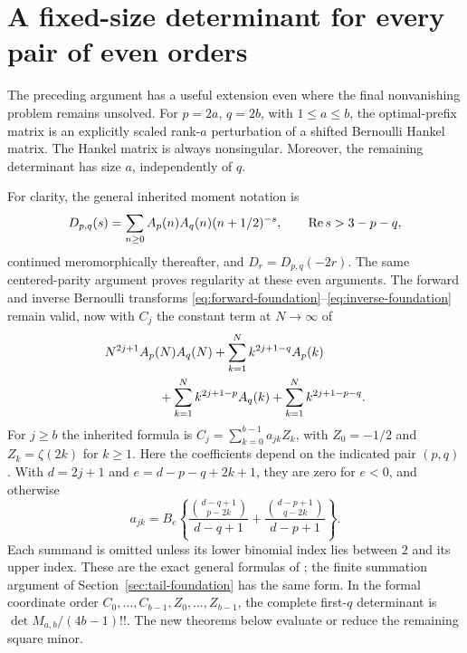 \section{A fixed-size determinant for every pair of even orders}
\label{sec:general-even-reduction}

The preceding argument has a useful extension even where the final
nonvanishing problem remains unsolved.  For $p=2a$, $q=2b$, with
$1\leq a\leq b$, the optimal-prefix matrix is an explicitly scaled
rank-$a$ perturbation of a shifted Bernoulli Hankel matrix.  The Hankel
matrix is always nonsingular.  Moreover, the remaining determinant
has size $a$, independently of $q$.

For clarity, the general inherited moment notation is
\[
 D_{p,q}(s)=\sum_{n\ge0}A_p(n)A_q(n)(n+1/2)^{-s},
 \qquad \operatorname{Re} s>3-p-q,
\]
continued meromorphically thereafter, and $D_r=D_{p,q}(-2r)$.
The same centered-parity argument proves regularity at these even
arguments. The forward and inverse Bernoulli transforms
\eqref{eq:forward-foundation}--\eqref{eq:inverse-foundation} remain valid,
now with $C_j$ the constant term at $N\to\infty$ of
\begin{align*}
 &N^{2j+1}A_p(N)A_q(N)
 +\sum_{k=1}^N k^{2j+1-q}A_p(k)\\
 &\hspace{15mm}
 +\sum_{k=1}^N k^{2j+1-p}A_q(k)
 +\sum_{k=1}^N k^{2j+1-p-q}.
\end{align*}
For $j\ge b$ the inherited formula is
$C_j=\sum_{k=0}^{b-1}a_{jk}Z_k$, with $Z_0=-1/2$ and
$Z_k=\zeta(2k)$ for $k\ge1$. Here the coefficients depend on
the indicated pair $(p,q)$. With $d=2j+1$ and
$e=d-p-q+2k+1$, they are zero for $e<0$, and otherwise
\begin{equation}\label{eq:general-source-entries}
 a_{jk}=B_e\left\{
 \frac{\binom{d-q+1}{p-2k}}{d-q+1}
 +\frac{\binom{d-p+1}{q-2k}}{d-p+1}\right\}.
\end{equation}
Each summand is omitted unless its lower binomial index lies between
$2$ and its upper index. These are the exact general formulas of
\cite[Section 7]{CanonicalFifth}; the finite summation argument of
Section~\ref{sec:tail-foundation} has the same form. In the formal
coordinate order $C_0,\ldots,C_{b-1},Z_0,\ldots,Z_{b-1}$, the
complete first-$q$ determinant is $\det M_{a,b}/(4b-1)!!$.
The new theorems below evaluate or reduce the remaining square minor.

